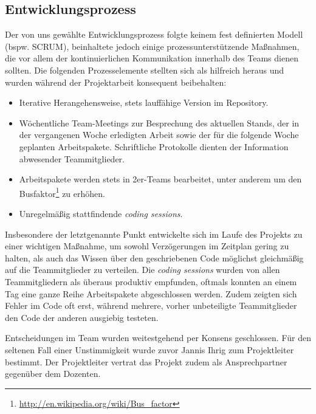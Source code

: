 \subsection{Entwicklungsprozess}
Der von uns gewählte Entwicklungsprozess folgte keinem fest definierten Modell (bspw. SCRUM), beinhaltete jedoch einige prozessunterstützende Maßnahmen, die vor allem der kontinuierlichen Kommunikation innerhalb des Teams dienen sollten. Die folgenden Prozesselemente stellten sich als hilfreich heraus und wurden während der Projektarbeit konsequent beibehalten:
\begin{itemize}
\item Iterative Herangehensweise, stets lauffähige Version im Repository.
\item Wöchentliche Team-Meetings zur Besprechung des aktuellen Stands, der in der vergangenen Woche erledigten Arbeit sowie der für die folgende Woche geplanten Arbeitspakete. Schriftliche Protokolle dienten der Information abwesender Teammitglieder.
\item Arbeitspakete werden stets in 2er-Teams bearbeitet, unter anderem um den Busfaktor\footnote{\url{http://en.wikipedia.org/wiki/Bus_factor}} zu erhöhen.
\item Unregelmäßig stattfindende \emph{coding sessions}.
\end{itemize}
Insbesondere der letztgenannte Punkt entwickelte sich im Laufe des Projekts zu einer wichtigen Maßnahme, um sowohl Verzögerungen im Zeitplan gering zu halten, als auch das Wissen über den geschriebenen Code möglichst gleichmäßig auf die Teammitglieder zu verteilen. Die \emph{coding sessions} wurden von allen Teammitgliedern als überaus produktiv empfunden, oftmals konnten an einem Tag eine ganze Reihe Arbeitspakete abgeschlossen werden. Zudem zeigten sich Fehler im Code oft erst, während mehrere, vorher unbeteiligte Teammitglieder den Code der anderen ausgiebig testeten.

Entscheidungen im Team wurden weitestgehend per Konsens geschlossen. Für den seltenen Fall einer Unstimmigkeit wurde zuvor Jannis Ihrig zum Projektleiter bestimmt. Der Projektleiter vertrat das Projekt zudem als Ansprechpartner gegenüber dem Dozenten.